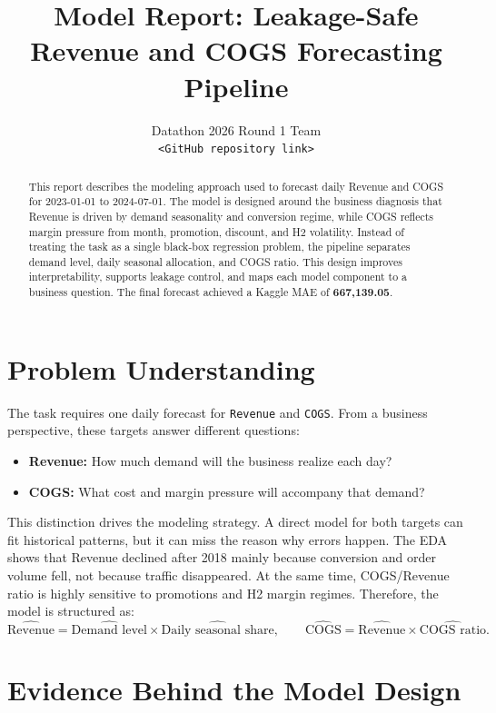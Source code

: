 \documentclass{article}
\title{Model Report: Leakage-Safe Revenue and COGS Forecasting Pipeline}
\author{
Datathon 2026 Round 1 Team \\
\texttt{<GitHub repository link>}
}
\newcommand{\metric}[1]{\textbf{#1}}
\begin{document}
\maketitle

\begin{abstract}
This report describes the modeling approach used to forecast daily Revenue and COGS for 2023-01-01 to 2024-07-01. The model is designed around the business diagnosis that Revenue is driven by demand seasonality and conversion regime, while COGS reflects margin pressure from month, promotion, discount, and H2 volatility. Instead of treating the task as a single black-box regression problem, the pipeline separates demand level, daily seasonal allocation, and COGS ratio. This design improves interpretability, supports leakage control, and maps each model component to a business question. The final forecast achieved a Kaggle MAE of \metric{667,139.05}.
\end{abstract}

\section{Problem Understanding}

The task requires one daily forecast for \texttt{Revenue} and \texttt{COGS}. From a business perspective, these targets answer different questions:
\begin{itemize}
  \item \textbf{Revenue:} How much demand will the business realize each day?
  \item \textbf{COGS:} What cost and margin pressure will accompany that demand?
\end{itemize}

This distinction drives the modeling strategy. A direct model for both targets can fit historical patterns, but it can miss the reason why errors happen. The EDA shows that Revenue declined after 2018 mainly because conversion and order volume fell, not because traffic disappeared. At the same time, COGS/Revenue ratio is highly sensitive to promotions and H2 margin regimes. Therefore, the model is structured as:
\[
  \widehat{\text{Revenue}} =
  \widehat{\text{Demand level}}
  \times
  \widehat{\text{Daily seasonal share}},
  \qquad
  \widehat{\text{COGS}} =
  \widehat{\text{Revenue}}
  \times
  \widehat{\text{COGS ratio}}.
\]

\section{Evidence Behind the Model Design}
\end{document}
